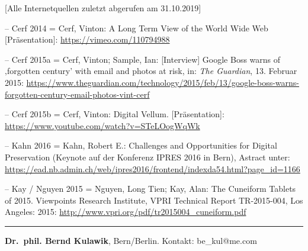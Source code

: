 \documentclass[a4paper,
fontsize=11pt,
oneside,
numbers=noperiodatend,
parskip=half-,
bibliography=totoc,
final
]{scrartcl}
\begin{document}
{[}Alle Internetquellen zuletzt abgerufen am 31.10.2019{]}

-- Cerf 2014 = Cerf, Vinton: A Long Term View of the World Wide Web
{[}Präsentation{]}: \url{https://vimeo.com/110794988}

-- Cerf 2015a = Cerf, Vinton; Sample, Ian: {[}Interview{]} Google Boss
warns of ‚forgotten century' with email and photos at risk, in:
\emph{The Guardian}, 13. Februar 2015:
\url{https://www.theguardian.com/technology/2015/feb/13/google-boss-warns-forgotten-century-email-photos-vint-cerf}

-- Cerf 2015b = Cerf, Vinton: Digital Vellum. {[}Präsentation{]}:
\url{https://www.youtube.com/watch?v=STeLOogWqWk}

-- Kahn 2016 = Kahn, Robert E.: Challenges and Opportunities for Digital
Preservation (Keynote auf der Konferenz IPRES 2016 in Bern), Astract
unter:
\url{https://ead.nb.admin.ch/web/ipres2016/frontend/indexda54.html?page_id=1166}

-- Kay / Nguyen 2015 = Nguyen, Long Tien; Kay, Alan: The Cuneiform
Tablets of 2015. Viewpoints Research Institute, VPRI Technical Report
TR-2015-004, Los Angeles: 2015:
\url{http://www.vpri.org/pdf/tr2015004_cuneiform.pdf}

\begin{center}\rule{0.5\linewidth}{0.5pt}\end{center}

\textbf{Dr.~phil. Bernd Kulawik}, Bern/Berlin. Kontakt: be\_kul@me.com
\end{document}
